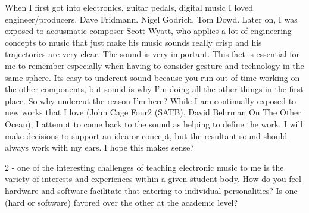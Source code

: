 When I first got into electronics, guitar pedals, digital music I loved engineer/producers. Dave Fridmann. Nigel Godrich. Tom Dowd.
  Later on, I was exposed to acousmatic composer Scott Wyatt, who applies a lot of engineering concepts to music that just make his music sounds really crisp and his trajectories are very clear. The sound is very important. This fact is essential for me to remember especially when having to consider gesture and technology in the same sphere. Its easy to undercut sound because you run out of time working on the other components, but sound is why I'm doing all the other things in the first place. So why undercut the reason I'm here?  While I am continually exposed to new works that I love (John Cage Four2 (SATB), David Behrman On The Other Ocean), I attempt to come back to the sound as helping to define the work. I will make decisions to support an idea or concept, but the resultant sound should always work with my ears. I hope this makes sense?

2 - one of the interesting challenges of teaching electronic music to me is the variety of interests and experiences within a given student body. How do you feel hardware and software facilitate that catering to individual personalities? Is one (hard or software) favored over the other at the academic level? 

